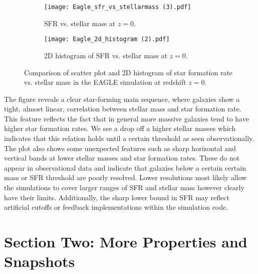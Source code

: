 \documentclass[10pt]{article}
\begin{document}
\begin{figure}[H]
    \centering
    \begin{subfigure}[t]{0.48\textwidth}
        \centering
        \texttt{[image: Eagle\_sfr\_vs\_stellarmass (3).pdf]}
        \caption{SFR vs. stellar mass at \( z = 0 \).\\\vspace{0.35cm}}  %
        \label{fig:eagle_sfr_mass}
    \end{subfigure}
    \hfill
    \begin{subfigure}[t]{0.48\textwidth}
        \centering
        \texttt{[image: Eagle\_2d\_histogram (2).pdf]}
        \caption{2D histogram of SFR vs. stellar mass at \( z = 0 \).}
        \label{fig:eagle_hist2d}
    \end{subfigure}
    \caption{Comparison of scatter plot and 2D histogram of star formation rate vs. stellar mass in the EAGLE simulation at redshift \( z = 0 \).}
    \label{fig:eagle_comparison}
\end{figure}

The figure reveals a clear star-forming main sequence, where galaxies show a tight, almost linear, correlation between stellar mass and star formation rate. This feature reflects the fact that in general more massive galaxies tend to have higher star formation rates. We see a drop off a higher stellar masses which indicates that this relation holds until a certain threshold as seen observationally. The plot also shows some unexpected features such as sharp horizontal and vertical bands at lower stellar masses and star formation rates. These do not appear in observational data and indicate that galaxies below a certain certain mass or SFR threshold are poorly resolved. Lower resolutions most likely allow the simulations to cover larger ranges of SFR and stellar mass however clearly have their limits. Additionally, the sharp lower bound in SFR may reflect artificial cutoffs or feedback implementations within the simulation code.



\section*{Section Two: More Properties and Snapshots}
\end{document}
